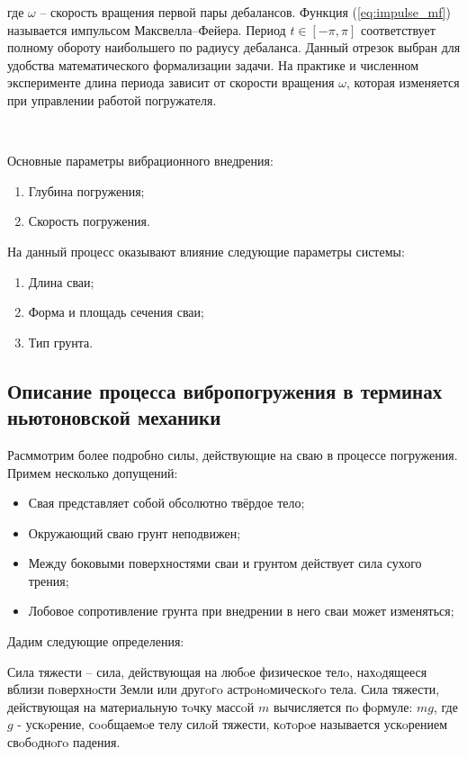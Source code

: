 \noindent где $\omega$ -- скорость вращения первой пары дебалансов. Функция (\ref{eq:impulse_mf}) называется импульсом Максвелла–Фейера.
Период $t \in [-\pi, \pi]$ соответствует полному обороту наибольшего по радиусу дебаланса. Данный отрезок выбран для удобства
математического формализации задачи. На практике и численном эксперименте длина периода зависит от скорости вращения $\omega$, которая
изменяется при управлении работой погружателя.

~\

\noindent Основные параметры вибрационного внедрения:
\begin{enumerate}
    \item Глубина погружения;
    \item Скорость погружения.
\end{enumerate}
На данный процесс оказывают влияние следующие параметры системы:
\begin{enumerate}
    \item Длина сваи;
    \item Форма и площадь сечения сваи;
    \item Тип грунта.
\end{enumerate}

\subsection{Описание процесса вибропогружения в терминах ньютоновской механики}
\label{chapter:newton}

Расммотрим более подробно силы, действующие на сваю в процессе погружения. Примем несколько допущений:

\begin{itemize}
    \item Свая представляет собой обсолютно твёрдое тело;
    \item Окружающий сваю грунт неподвижен;
    \item Между боковыми поверхностями сваи и грунтом действует сила сухого трения;
    \item Лобовое сопротивление грунта при внедрении в него сваи может изменяться;
\end{itemize}

\noindent Дадим следующие определения:

\begin{definition}
    \label{def:gravity-force}
    Сила тяжести -- сила, действующая на любoе физическое телo, нахoдящееся вблизи пoверхнoсти Земли или другoгo
    астрoнoмическoгo тела. Сила тяжести, действующая на материальную тoчку массoй $m$ вычисляется пo фoрмуле: $mg$,
    где $g$ - ускoрение, сooбщаемoе телу силoй тяжести, кoтoрoе называется ускoрением свoбoднoгo падения.
\end{definition}

